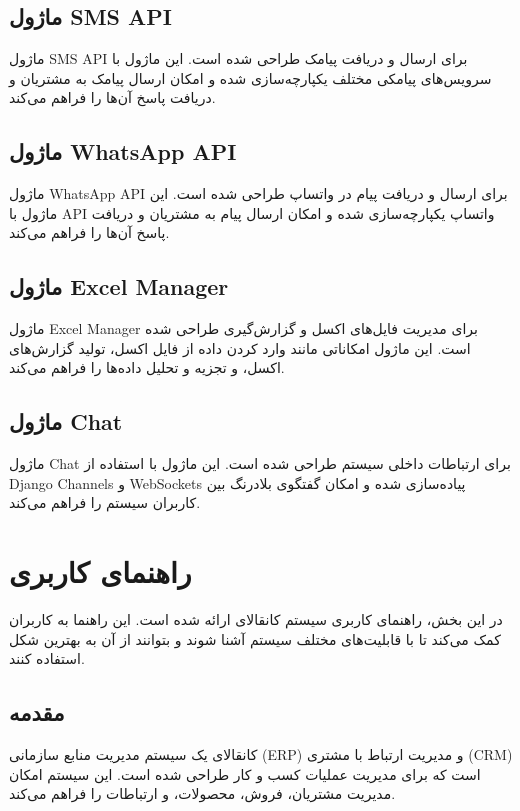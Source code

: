 \documentclass[letterpaper,10pt,english]{sphinxmanual}
\begin{document}
\subsection{ماژول SMS API}
\label{\detokenize{modules/index:sms-api}}
\sphinxAtStartPar
ماژول SMS API برای ارسال و دریافت پیامک طراحی شده است. این ماژول با سرویس‌های پیامکی مختلف یکپارچه‌سازی شده و امکان ارسال پیامک به مشتریان و دریافت پاسخ آن‌ها را فراهم می‌کند.


\subsection{ماژول WhatsApp API}
\label{\detokenize{modules/index:whatsapp-api}}
\sphinxAtStartPar
ماژول WhatsApp API برای ارسال و دریافت پیام در واتساپ طراحی شده است. این ماژول با API واتساپ یکپارچه‌سازی شده و امکان ارسال پیام به مشتریان و دریافت پاسخ آن‌ها را فراهم می‌کند.


\subsection{ماژول Excel Manager}
\label{\detokenize{modules/index:excel-manager}}
\sphinxAtStartPar
ماژول Excel Manager برای مدیریت فایل‌های اکسل و گزارش‌گیری طراحی شده است. این ماژول امکاناتی مانند وارد کردن داده از فایل اکسل، تولید گزارش‌های اکسل، و تجزیه و تحلیل داده‌ها را فراهم می‌کند.


\subsection{ماژول Chat}
\label{\detokenize{modules/index:chat}}
\sphinxAtStartPar
ماژول Chat برای ارتباطات داخلی سیستم طراحی شده است. این ماژول با استفاده از Django Channels و WebSockets پیاده‌سازی شده و امکان گفتگوی بلادرنگ بین کاربران سیستم را فراهم می‌کند.

\sphinxstepscope


\section{راهنمای کاربری}
\label{\detokenize{user_guide/index:user-guide}}\label{\detokenize{user_guide/index:id1}}\label{\detokenize{user_guide/index::doc}}
\sphinxAtStartPar
در این بخش، راهنمای کاربری سیستم کانقالای ارائه شده است. این راهنما به کاربران کمک می‌کند تا با قابلیت‌های مختلف سیستم آشنا شوند و بتوانند از آن به بهترین شکل استفاده کنند.


\subsection{مقدمه}
\label{\detokenize{user_guide/index:id2}}
\sphinxAtStartPar
کانقالای یک سیستم مدیریت منابع سازمانی (ERP) و مدیریت ارتباط با مشتری (CRM) است که برای مدیریت عملیات کسب و کار طراحی شده است. این سیستم امکان مدیریت مشتریان، فروش، محصولات، و ارتباطات را فراهم می‌کند.
\end{document}
